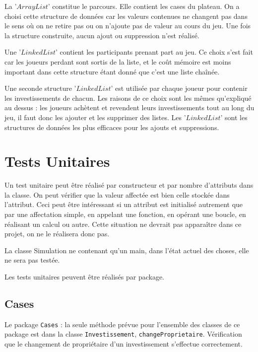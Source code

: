 \documentclass[11pt, a4paper]{report}
\begin{document}
	La '$ArrayList$' constitue le parcours. Elle contient les cases du plateau. On a choisi cette structure de données car les valeurs contenues ne changent pas dans le sens où on ne retire pas ou on n'ajoute pas de valeur au cours du jeu. Une fois la structure construite, aucun ajout ou suppression n'est réalisé.
	
	Une '$LinkedList$' contient les participants prenant part au jeu. Ce choix s'est fait car les joueurs perdant sont sortis de la liste, et le coût mémoire est moins important dans cette structure étant donné que c'est une liste chaînée.
	
	Une seconde structure '$LinkedList$' est utilisée par chaque joueur pour contenir les investissements de chacun. Les raisons de ce choix sont les mêmes qu'expliqué au dessus : les joueurs achètent et revendent leurs investissements tout au long du jeu, il faut donc les ajouter et les supprimer des listes. Les '$LinkedList$' sont les structures de données les plus efficaces pour les ajouts et suppressions.
	
	
	\chapter{Tests Unitaires}
	
	Un test unitaire peut être réalisé par constructeur et par nombre d'attributs dans la classe. On peut vérifier que la valeur affectée est bien celle stockée dans l'attribut. Ceci peut être intéressant si un attribut est initialisé autrement que par une affectation simple, en appelant une fonction, en opérant une boucle, en réalisant un calcul ou autre. Cette situation ne devrait pas apparaître dans ce projet, on ne le réalisera donc pas.
	
	La classe Simulation ne contenant qu'un main, dans l'état actuel des choses, elle ne sera pas testée.
	
	Les tests unitaires peuvent être réalisés par package.
	
	
	\section{Cases}
	
	Le package \verb|Cases| : la seule méthode prévue pour l'ensemble des classes de ce package est dans la classe \verb|Investissement|, \verb|changeProprietaire|. Vérification que le changement de propriétaire d'un investissement s'effectue correctement.
	
	
	
\end{document}

